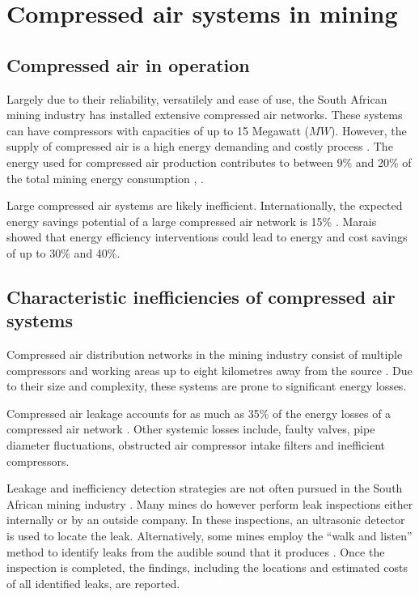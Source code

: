\section{Compressed air systems in mining}
	\subsection{Compressed air in operation}\label{key}
		Largely due to their reliability, versatilely and ease of use, the South African mining industry has installed extensive compressed air networks. These systems can have compressors with capacities of up to 15 Megawatt ($MW$)\cite{Marais2012PhD}.
		However, the supply of compressed air is a high energy demanding and costly process \cite{padachi2009energy}. The energy used for compressed air production contributes to between 9\% and 20\% of the total mining energy consumption	\cite{Eskom2010Energy}, \cite{du2011development}. 
		\par
		Large compressed air systems are likely inefficient. Internationally, the expected energy savings potential of a large compressed air network is 15\% \cite{neale2009compressed}. Marais \cite{marais2013simplification} showed that energy efficiency interventions could lead to energy and cost savings of up to 30\% and 40\%. 
	 
	\subsection{Characteristic inefficiencies of compressed air systems}
		Compressed air distribution networks in the mining industry consist of multiple compressors and working areas up to eight kilometres away from the source \cite{Marais2012PhD}. Due to their size and complexity, these systems are prone to significant energy losses.
		\par 
		Compressed air leakage accounts for as much as 35\% of the energy losses of a compressed air network \cite{Lawrence2004Improving}. Other systemic losses include, faulty valves, pipe diameter fluctuations, obstructed air compressor intake filters and inefficient compressors. 	
	
		Leakage and inefficiency detection strategies are not often pursued in the South African mining industry \cite{vanTonder2010Masters}. Many mines do however perform leak inspections either internally or by an outside company. In these inspections, an ultrasonic detector is used to locate the leak. Alternatively, some mines employ the \enquote{walk and listen} method to identify leaks from the audible sound that it produces \cite{vanTonder2010Masters}. Once the inspection is completed, the findings, including the locations and estimated costs of all identified leaks, are reported.
		
